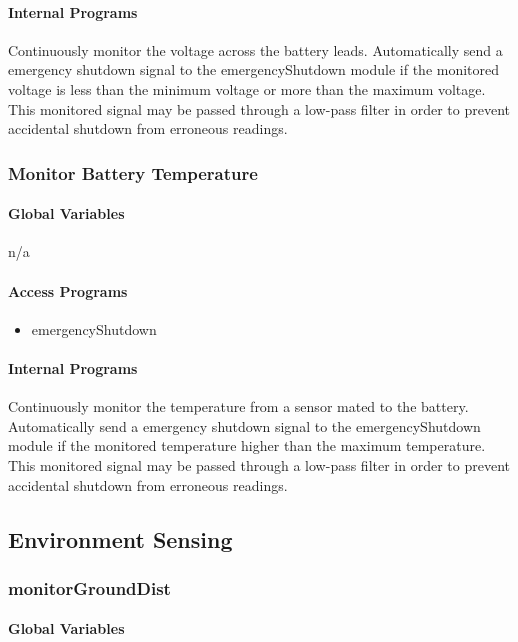 \documentclass[10pt,letterpaper]{article}
\begin{document}
\paragraph{Internal Programs}
Continuously monitor the voltage across the battery leads. Automatically send a emergency shutdown signal to the emergencyShutdown module if the monitored voltage is less than the minimum voltage or more than the maximum voltage. This monitored signal may be passed through a low-pass filter in order to prevent accidental shutdown from erroneous readings.

\subsubsection{Monitor Battery Temperature}
\paragraph{Global Variables}
n/a
\paragraph{Access Programs}
\begin{itemize}
\item emergencyShutdown
\end{itemize}
\paragraph{Internal Programs}
Continuously monitor the temperature from a sensor mated to the battery. Automatically send a emergency shutdown signal to the emergencyShutdown module if the monitored temperature higher than the maximum temperature. This monitored signal may be passed through a low-pass filter in order to prevent accidental shutdown from erroneous readings.


\newpage

\subsection{Environment Sensing}
\subsubsection{monitorGroundDist}
\paragraph{Global Variables}
~
\begin{table}[H]
  \caption{monitorGroundDist}
\end{table}
\end{document}
